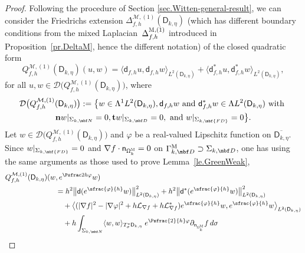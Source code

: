 \begin{proof}
Following the procedure of Section \ref{sec.Witten-general-result}, we
can consider the Friedrichs extension $\Delta_{f,h}^{
\mathcal M,(1)} (\mathsf D_{k,\eta})$ (which has different
boundary conditions from the mixed Laplacian~$\Delta_{f,h}^{
\textsc{M},(1)}$ introduced in Proposition~\ref{pr.DeltaM}, hence
the different notation) of the closed quadratic form\vspace*{-3pt}
\[
Q_{f,h}^{ \mathcal M,(1)} (\mathsf D_{k,\eta})(u,w)=\langle \mathsf d_{f,h} u,\mathsf d_{f,h}w \rangle_{L^2(\mathsf D_{k,\eta})} +\langle \mathsf d^*_{f,h}u,\mathsf d^*_{f,h}w \rangle_{L^2(\mathsf D_{k,\eta})},
\]
for all $u,w\in\mathcal D\bigl(Q_{f,h}^{ \mathcal M,(1)} (\mathsf D_{k,\eta})\bigr)$, where\vspace*{-5pt}
\begin{multline*}
\mathcal D\bigl(Q_{f,h}^{ \mathcal M,(1)} (\mathsf D_{k,\eta})\bigr):=\big \{w\in \Lambda^1L^2(\mathsf D_{k,\eta}), \mathsf d_{f,h}w \text{ and } \mathsf d^*_{f,h} w\in \Lambda L^2(\mathsf D_{k,\eta}) \text{ with }\\
\mathbf n w|_{\Sigma_{k,\mbf N} }=0, \mathbf t w|_{\Sigma_{k,\mbf D} }=0, \text{ and } 
w|_{\Sigma_{k,\mbf{FD}} }=0 \big\}.
\end{multline*}
Let $w\in \mathcal D\bigl(Q_{f,h}^{ \mathcal M,(1)} (\mathsf D_{k,\eta})\bigr)$ and $\varphi$ be a real-valued Lipschitz
function on $\overline{\mathsf D_{k,\eta}}$.
Since $w|_{\Sigma_{k,\mbf{FD}} }=0 $ and $\nabla f \cdot \mathsf n_{\mathsf \Omega_k^{\textsc{M}} }=0$ on $\Gamma_{k, \mbf D}^{\text{M}}\supset \Sigma_{k, \mbf D}$, one has using the same arguments as those used to prove Lemma~\ref{le.GreenWeak},
\begin{equation}
\label{eq.Spec2}
\begin{aligned}
Q_{f,h}^{ \mathcal M,(1)} (\mathsf D_{k,\eta})(w&,e^{\Psfrac 2h
\varphi} w)\\
&=
h^{2}\big \| \mathsf d (e^{\sfrac{\varphi}{h}} w)\big \|^{2}_{ L^{2} (\mathsf D_{k,\eta})}+
h^{2} \big \| \mathsf d^{*} (e^{\sfrac{\varphi}{h}} w) \big \|^{2}_{ L^{2} (\mathsf D_{k,\eta})}\\
&\quad + \big \langle
(|\nabla f|^{2}-|\nabla \varphi|^{2}+h\mathcal{L}_{\nabla
f}+h\mathcal{L}_{\nabla
f}^{*})e^{\sfrac{\varphi}{h}} w, e^{\sfrac{\varphi}{h}}
w\big \rangle_{ L^{2} (\mathsf D_{k,\eta})}\\
&\quad +h \int_{\Sigma_{k,\mbf N}}
\langle w,w
\rangle_{ T_{\sigma}^{*} \mathsf D_{k,\eta} }\;e^{\Psfrac{2 }{h}\varphi }\partial_{\mathsf n_{ \mathsf \Omega_k^{\textsc{M}} } }f\, d\sigma\\

\end{aligned}
\end{equation}
\end{proof}

